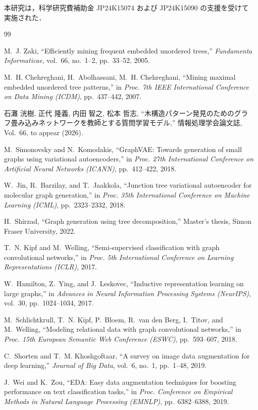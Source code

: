 \documentclass[submit,techrep,noauthor]{ipsj}
\begin{document}
\begin{acknowledgment}
本研究は，科学研究費補助金 JP24K15074 および JP24K15090 の支援を受けて実施された．
\end{acknowledgment}


\begin{thebibliography}{99}

M.~J. Zaki,
``Efficiently mining frequent embedded unordered trees,''
\textit{Fundamenta Informaticae},
vol.~66, no.~1--2, pp.~33--52, 2005.

M.~H. Chehreghani, H.~Abolhassani, M.~H. Chehreghani,
``Mining maximal embedded unordered tree patterns,''
in \textit{Proc. 7th IEEE International Conference on Data Mining (ICDM)},
pp.~437--442, 2007.

石灘 洸樹, 正代 隆義, 内田 智之, 松本 哲志,
``木構造パターン発見のためのグラフ畳み込みネットワークを教師とする質問学習モデル,''
情報処理学会論文誌, Vol.~66, to appear (2026).

M.~Simonovsky and N.~Komodakis,
``GraphVAE: Towards generation of small graphs using variational autoencoders,''
in \textit{Proc. 27th International Conference on Artificial Neural Networks (ICANN)},
pp.~412--422, 2018.

W.~Jin, R.~Barzilay, and T.~Jaakkola,
``Junction tree variational autoencoder for molecular graph generation,''
in \textit{Proc. 35th International Conference on Machine Learning (ICML)},
pp.~2323--2332, 2018.

H.~Shirzad,
``Graph generation using tree decomposition,''
Master's thesis, Simon Fraser University, 2022.

T.~N. Kipf and M.~Welling,
``Semi-supervised classification with graph convolutional networks,''
in \textit{Proc. 5th International Conference on Learning Representations (ICLR)},
2017.

W.~Hamilton, Z.~Ying, and J.~Leskovec,
``Inductive representation learning on large graphs,''
in \textit{Advances in Neural Information Processing Systems (NeurIPS)},
vol.~30, pp.~1024--1034, 2017.

M.~Schlichtkrull, T.~N. Kipf, P.~Bloem, R.~van den Berg, I.~Titov, and M.~Welling,
``Modeling relational data with graph convolutional networks,''
in \textit{Proc. 15th European Semantic Web Conference (ESWC)},
pp.~593--607, 2018.

C.~Shorten and T.~M. Khoshgoftaar,
``A survey on image data augmentation for deep learning,''
\textit{Journal of Big Data},
vol.~6, no.~1, pp.~1--48, 2019.

J.~Wei and K.~Zou,
``EDA: Easy data augmentation techniques for boosting performance on text classification tasks,''
in \textit{Proc. Conference on Empirical Methods in Natural Language Processing (EMNLP)},
pp.~6382--6388, 2019.

\end{thebibliography}
\end{document}
